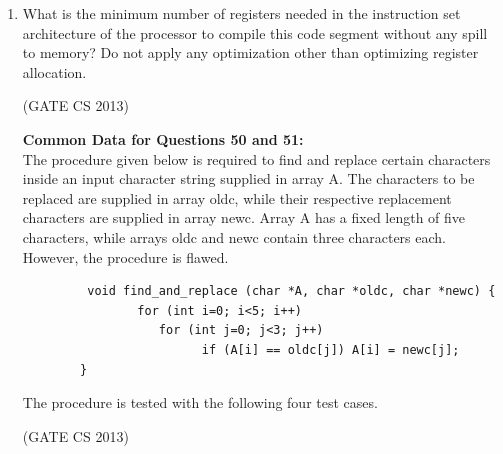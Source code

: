 \documentclass[a4paper, 11pt]{article}
\begin{document}
\begin{enumerate}
     \item What is the minimum number of registers needed in the instruction set architecture of the processor to compile this code segment without any spill to memory? Do not apply any optimization other than optimizing register allocation.
     \begin{enumerate}
     \end{enumerate}
     \hfill (GATE CS 2013)

     \textbf{Common Data for Questions 50 and 51:}\\
     The procedure given below is required to find and replace certain characters inside an input character string supplied in array A. The characters to be replaced are supplied in array oldc, while their respective replacement characters are supplied in array newc. Array A has a fixed length of five characters, while arrays oldc and newc contain three characters each. However, the procedure is flawed.
     \begin{lstlisting}
         void find_and_replace (char *A, char *oldc, char *newc) {
                for (int i=0; i<5; i++)
                   for (int j=0; j<3; j++)
                         if (A[i] == oldc[j]) A[i] = newc[j];
        } 

     \end{lstlisting}
     The procedure is tested with the following four test cases. 
     \begin{enumerate}
     \end{enumerate}
     \hfill (GATE CS 2013)


\end{enumerate}
\end{document}
